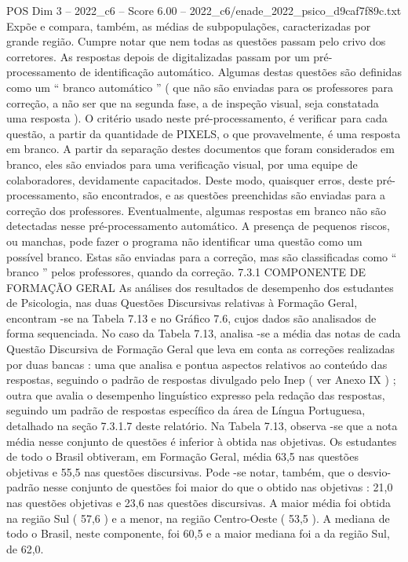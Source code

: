 \begin{textsample}{POS Dim 3 – 2022\_c6 – Score 6.00 – 2022\_c6/enade\_2022\_psico\_d9caf7f89c.txt}
Expõe e compara, também, as médias de subpopulações, caracterizadas por grande região.
Cumpre notar que nem todas as questões passam pelo crivo dos corretores.
As respostas depois de digitalizadas passam por um pré-processamento de identificação automático.
Algumas destas questões são definidas como um “ branco automático ” ( que não são enviadas para os professores para correção, a não ser que na segunda fase, a de inspeção visual, seja constatada uma resposta ).
O critério usado neste pré-processamento, é verificar para cada questão, a partir da quantidade de PIXELS, o que provavelmente, é uma resposta em branco.
A partir da separação destes documentos que foram considerados em branco, eles são enviados para uma verificação visual, por uma equipe de colaboradores, devidamente capacitados.
Deste modo, quaisquer erros, deste pré-processamento, são encontrados, e as questões preenchidas são enviadas para a correção dos professores.
Eventualmente, algumas respostas em branco não são detectadas nesse pré-processamento automático.
A presença de pequenos riscos, ou manchas, pode fazer o programa não identificar uma questão como um possível branco.
Estas são enviadas para a correção, mas são classificadas como “ branco ” pelos professores, quando da correção. 7.3.1 COMPONENTE DE FORMAÇÃO GERAL As análises dos resultados de desempenho dos estudantes de Psicologia, nas duas Questões Discursivas relativas à Formação Geral, encontram -se na Tabela 7.13 e no Gráfico 7.6, cujos dados são analisados de forma sequenciada.
No caso da Tabela 7.13, analisa -se a média das notas de cada Questão Discursiva de Formação Geral que leva em conta as correções realizadas por duas bancas : uma que analisa e pontua aspectos relativos ao conteúdo das respostas, seguindo o padrão de respostas divulgado pelo Inep ( ver Anexo IX ) ; outra que avalia o desempenho linguístico expresso pela redação das respostas, seguindo um padrão de respostas específico da área de Língua Portuguesa, detalhado na seção 7.3.1.7 deste relatório.
Na Tabela 7.13, observa -se que a nota média nesse conjunto de questões é inferior à obtida nas objetivas.
Os estudantes de todo o Brasil obtiveram, em Formação Geral, média 63,5 nas questões objetivas e 55,5 nas questões discursivas.
Pode -se notar, também, que o desvio-padrão nesse conjunto de questões foi maior do que o obtido nas objetivas : 21,0 nas questões objetivas e 23,6 nas questões discursivas.
A maior média foi obtida na região Sul ( 57,6 ) e a menor, na região Centro-Oeste ( 53,5 ).
A mediana de todo o Brasil, neste componente, foi 60,5 e a maior mediana foi a da região Sul, de 62,0.

\end{textsample}
